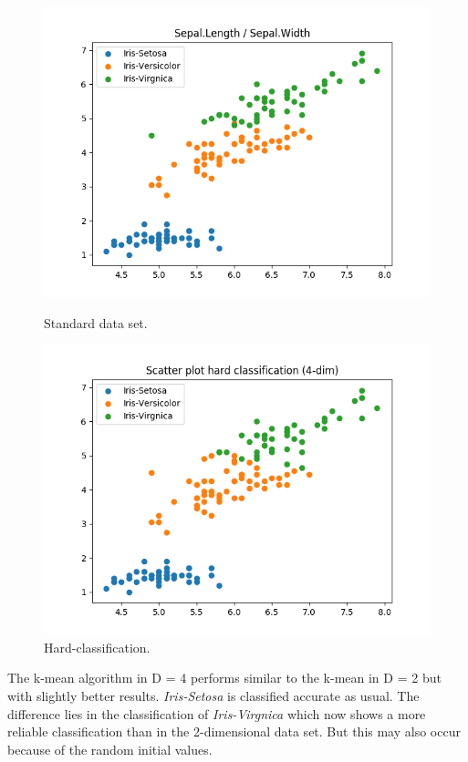 \documentclass[a4paper]{article}
\begin{document}
\begin{figure}[htp]
\begin{minipage}{0.4\textwidth}
	\centering
  \includegraphics[scale=0.6]{plots/basic_scenario2_cmpnt3.png}
  \caption{Standard data set.}
\end{minipage}
\hfill
\begin{minipage}{0.4\textwidth}
	\centering
  \includegraphics[scale=0.6]{plots/hard_scatter_scenario2_cmpnt3.png}
  \caption{Hard-classification.}
\end{minipage}
\end{figure}

\noindent
The k-mean algorithm in D = 4 performs similar to the k-mean in D = 2 but with slightly better results. \textit{Iris-Setosa} is classified accurate as usual. The difference lies in the classification of \textit{Iris-Virgnica} which now shows a more reliable classification than in the 2-dimensional data set. But this may also occur because of the random initial values.
\end{document}
